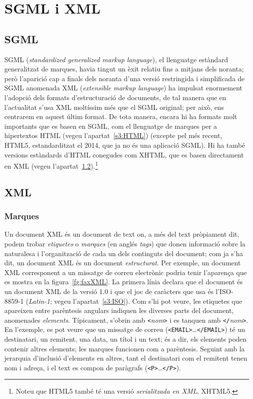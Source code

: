\section{SGML i XML} \label{s3:SGML} \label{ss:SGML}

\subsection{SGML}
SGML (\emph{standardized generalized markup language}), el llenguatge
estàndard generalitzat de marques, havia tingut un èxit relatiu fins a
mitjans dels noranta; però l'aparició cap a finals dels noranta d'una
versió restringida i simplificada de SGML anomenada XML
(\emph{extensible markup language}) ha impulsat enormement l'adopció
dels formats d'estructuració de documents, de tal manera que en
l'actualitat s'usa XML moltíssim més que el SGML original; per això,
ens centrarem en aquest últim format. De tota manera, encara hi ha
formats molt importants que es basen en SGML, com el llenguatge de
marques per a hipertextos HTML (vegeu l'apartat~\ref{s3:HTML})
(excepte pel més recent, HTML5, estandarditzat el 2014, que ja no és
una aplicació SGML). Hi ha també versions estàndards d'HTML conegudes
com XHTML, que es basen directament en XML (vegeu
l'apartat~\ref{s3:XML}).\footnote{Noteu que HTML5 també té una versió
  \emph{serialitzada en XML}, XHTML5.}

\subsection{XML} \label{s3:XML}

\subsubsection{Marques}
Un document XML és un document de text on, a més del text pròpiament
dit, podem trobar \emph{etiquetes} o \emph{marques} (en anglés
\emph{tags}) que donen informació sobre la naturalesa i l'organització
de cada un dels continguts del document; com ja s'ha dit, un document
XML és un document \emph{estructurat}. Per exemple, un document XML
corresponent a un missatge de correu electrònic podria tenir
l'aparença que es mostra en la figura~\ref{fg:faxXML}.  La primera
línia declara que el document és un document XML de la versió 1.0 i
que el joc de caràcters que usa és l'ISO-8859-1 (\emph{Latin-1}; vegeu
l'apartat~\ref{s3:ISO}). Com s'hi pot veure, les etiquetes que
apareixen entre parèntesis angulars indiquen les diverses parts del
document, anomenades \emph{elements}.  Típicament, s'obrin amb
\texttt{<}\emph{nom}\texttt{>} i es tanquen amb
\texttt{</}\emph{nom}\texttt{>}.  En l'exemple, es pot veure que un
missatge de correu (\texttt{<EMAIL>}\ldots\texttt{</EMAIL>}) té un
destinatari, un remitent, una data, un títol i un text; és a dir, els
elements poden contenir altres elements; les marques funcionen com a
parèntesis. Seguint amb la jerarquia d'inclusió d'elements en altres,
tant el destinatari com el remitent tenen nom i adreça, i el text es
compon de paràgrafs (\texttt{<P>}\ldots\texttt{</P>}).

